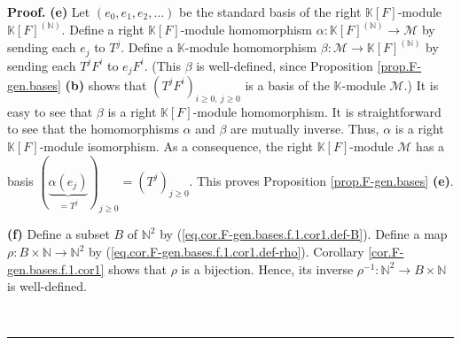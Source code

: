 \documentclass[numbers=enddot,12pt,final,onecolumn,notitlepage]{scrartcl}%
\theoremstyle{definition}
\newenvironment{proof}[1][Proof]{\noindent\textbf{#1.} }{\ \rule{0.5em}{0.5em}}
\begin{document}
\begin{proof}
\textbf{(e)} Let $\left(  e_{0},e_{1},e_{2},\ldots\right)  $ be the standard
basis of the right $\mathbb{K}\left[  F\right]  $-module $\mathbb{K}\left[
F\right]  ^{\left(  \mathbb{N}\right)  }$. Define a right $\mathbb{K}\left[
F\right]  $-module homomorphism $\alpha:\mathbb{K}\left[  F\right]  ^{\left(
\mathbb{N}\right)  }\rightarrow\mathcal{M}$ by sending each $e_{j}$ to $T^{j}%
$. Define a $\mathbb{K}$-module homomorphism $\beta:\mathcal{M}\rightarrow
\mathbb{K}\left[  F\right]  ^{\left(  \mathbb{N}\right)  }$ by sending each
$T^{j}F^{i}$ to $e_{j}F^{i}$. (This $\beta$ is well-defined, since Proposition
\ref{prop.F-gen.bases} \textbf{(b)} shows that $\left(  T^{j}F^{i}\right)
_{i\geq0,\ j\geq0}$ is a basis of the $\mathbb{K}$-module $\mathcal{M}$.) It
is easy to see that $\beta$ is a right $\mathbb{K}\left[  F\right]  $-module
homomorphism. It is straightforward to see that the homomorphisms $\alpha$ and
$\beta$ are mutually inverse. Thus, $\alpha$ is a right $\mathbb{K}\left[
F\right]  $-module isomorphism. As a consequence, the right $\mathbb{K}\left[
F\right]  $-module $\mathcal{M}$ has a basis $\left(  \underbrace{\alpha
\left(  e_{j}\right)  }_{=T^{j}}\right)  _{j\geq0}=\left(  T^{j}\right)
_{j\geq0}$. This proves Proposition \ref{prop.F-gen.bases} \textbf{(e)}.
\medskip

\textbf{(f)} Define a subset $B$ of $\mathbb{N}^{2}$ by
(\ref{eq.cor.F-gen.bases.f.1.cor1.def-B}). Define a map $\rho:B\times
\mathbb{N}\rightarrow\mathbb{N}^{2}$ by
(\ref{eq.cor.F-gen.bases.f.1.cor1.def-rho}). Corollary
\ref{cor.F-gen.bases.f.1.cor1} shows that $\rho$ is a bijection. Hence, its
inverse $\rho^{-1}:\mathbb{N}^{2}\rightarrow B\times\mathbb{N}$ is well-defined.


\end{proof}
\end{document}
